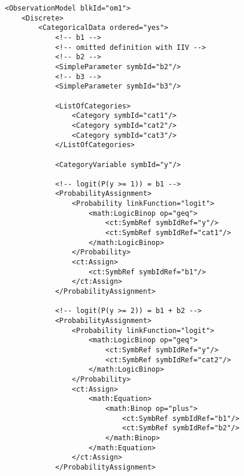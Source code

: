 \lstset{language=XML}
\begin{lstlisting}
        <ObservationModel blkId="om1">
            <Discrete>
                <CategoricalData ordered="yes">           
                    <!-- b1 -->
                    <!-- omitted definition with IIV -->
                    <!-- b2 -->
                    <SimpleParameter symbId="b2"/>
                    <!-- b3 -->
                    <SimpleParameter symbId="b3"/>
                    
                    <ListOfCategories> 
                        <Category symbId="cat1"/>
                        <Category symbId="cat2"/>
                        <Category symbId="cat3"/>
                    </ListOfCategories>
                    
                    <CategoryVariable symbId="y"/>
                    
                    <!-- logit(P(y >= 1)) = b1 -->
                    <ProbabilityAssignment>
                        <Probability linkFunction="logit">
                            <math:LogicBinop op="geq">
                                <ct:SymbRef symbIdRef="y"/>
                                <ct:SymbRef symbIdRef="cat1"/>
                            </math:LogicBinop>
                        </Probability>
                        <ct:Assign>
                            <ct:SymbRef symbIdRef="b1"/>
                        </ct:Assign>
                    </ProbabilityAssignment>
                    
                    <!-- logit(P(y >= 2)) = b1 + b2 --> 
                    <ProbabilityAssignment>
                        <Probability linkFunction="logit">
                            <math:LogicBinop op="geq">
                                <ct:SymbRef symbIdRef="y"/>
                                <ct:SymbRef symbIdRef="cat2"/>
                            </math:LogicBinop>
                        </Probability>
                        <ct:Assign>
                            <math:Equation>
                                <math:Binop op="plus">
                                    <ct:SymbRef symbIdRef="b1"/>
                                    <ct:SymbRef symbIdRef="b2"/>
                                </math:Binop>
                            </math:Equation>
                        </ct:Assign>
                    </ProbabilityAssignment>
                    

\end{lstlisting}
